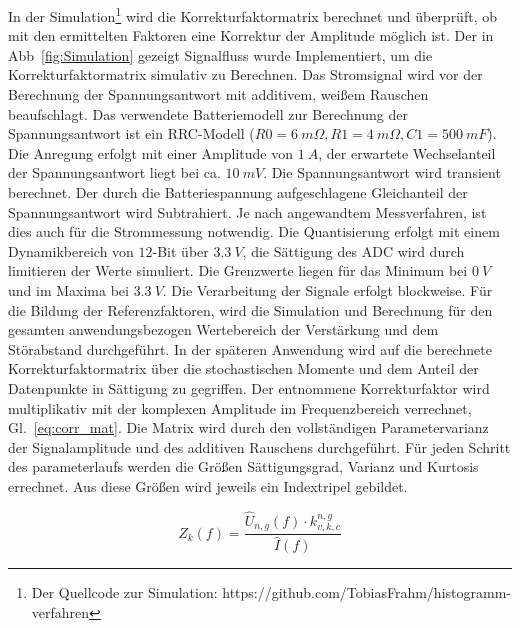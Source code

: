 In der Simulation\footnote[2]{Der Quellcode zur Simulation: https://github.com/TobiasFrahm/histogramm-verfahren} wird die Korrekturfaktormatrix berechnet und überprüft, ob mit den ermittelten Faktoren eine Korrektur der Amplitude möglich ist. 
Der in Abb~\ref{fig:Simulation} gezeigt Signalfluss wurde Implementiert, um die Korrekturfaktormatrix simulativ zu Berechnen. Das Stromsignal wird vor der Berechnung der Spannungsantwort mit additivem, weißem Rauschen beaufschlagt. Das verwendete Batteriemodell zur Berechnung der Spannungsantwort ist ein RRC-Modell ($R0 = \SI{6}{m\Omega}, R1=\SI{4}{m\Omega}, C1=\SI{500}{mF}$). Die Anregung erfolgt mit einer Amplitude von $\SI{1}{A}$, der erwartete Wechselanteil der Spannungsantwort liegt bei ca. $\SI{10}{mV}$. Die Spannungsantwort wird transient berechnet. Der durch die Batteriespannung aufgeschlagene Gleichanteil der Spannungsantwort wird Subtrahiert. Je nach angewandtem Messverfahren, ist dies auch für die Strommessung notwendig. Die Quantisierung erfolgt mit einem Dynamikbereich von $12$-Bit über $\SI{3.3}{V}$, die Sättigung des ADC wird durch limitieren der Werte simuliert. Die Grenzwerte liegen für das Minimum bei $\SI{0}{V}$ und im Maxima bei $\SI{3.3}{V}$. Die Verarbeitung der Signale erfolgt blockweise. Für die Bildung der Referenzfaktoren, wird die Simulation und Berechnung für den gesamten anwendungsbezogen Wertebereich der Verstärkung und dem Störabstand durchgeführt. In der späteren Anwendung wird auf die berechnete Korrekturfaktormatrix über die stochastischen Momente und dem Anteil der Datenpunkte in Sättigung zu gegriffen. Der entnommene Korrekturfaktor wird multiplikativ mit der komplexen Amplitude im Frequenzbereich verrechnet, Gl.~\eqref{eq:corr_mat}. Die Matrix wird durch den vollständigen Parametervarianz der Signalamplitude und des additiven Rauschens durchgeführt. Für jeden Schritt des parameterlaufs werden die Größen Sättigungsgrad, Varianz und Kurtosis errechnet. Aus diese Größen wird jeweils ein Indextripel gebildet.


\begin{equation}
	\label{eq:corr_mat}
	Z_k(f) = \frac{\hat{U}_{n,g}(f) \cdot k_{v,k,c}^{n,g}}{\hat{I}(f)}
\end{equation}

